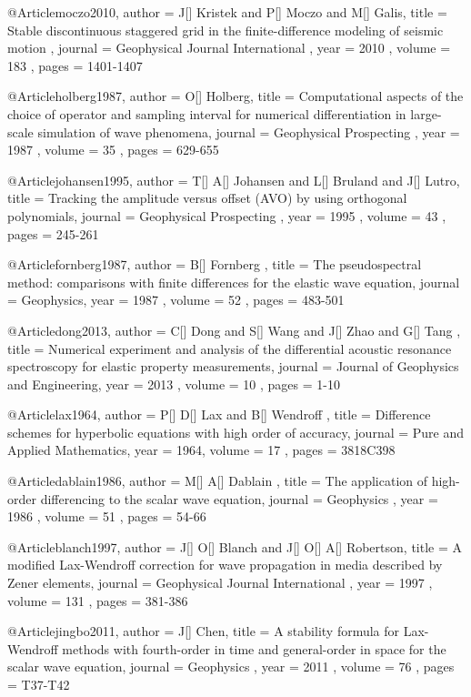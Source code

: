 {@Article{moczo2010,
 author =  {  J[] Kristek and P[] Moczo and M[] Galis},
 title =   {Stable discontinuous staggered grid in the finite-difference modeling of seismic motion },
 journal = { Geophysical Journal International },
 year =    { 2010 },
 volume =  { 183 },
 pages =   { 1401-1407 }
}

@Article{holberg1987,
 author =  { O[] Holberg},
 title =   {Computational aspects of the choice of operator and sampling interval for numerical differentiation in large-scale simulation of wave phenomena},
 journal = { Geophysical Prospecting },
 year =    { 1987 },
 volume =  { 35 },
 pages =   { 629-655 }
}

@Article{johansen1995,
 author =  { T[] A[] Johansen and L[] Bruland and J[] Lutro},
 title =   {Tracking the amplitude versus offset (AVO) by using orthogonal polynomials},
 journal = { Geophysical Prospecting },
 year =    { 1995 },
 volume =  { 43 },
 pages =   { 245-261 }
}

@Article{fornberg1987,
 author =  { B[] Fornberg },
 title =   {The pseudospectral method: comparisons with finite differences for the elastic
wave equation},
 journal = { Geophysics},
 year =    { 1987 },
 volume =  { 52 },
 pages =   { 483-501 }
}

@Article{dong2013,
 author =  { C[] Dong and S[] Wang and J[] Zhao and G[] Tang },
 title =   {Numerical experiment and analysis of the differential acoustic resonance spectroscopy for elastic property measurements},
 journal = { Journal of Geophysics and Engineering},
 year =    { 2013 },
 volume =  { 10 },
 pages =   { 1-10 }
}

@Article{lax1964,
 author =  { P[] D[] Lax and B[] Wendroff },
 title =   {Difference schemes for hyperbolic equations with high order of accuracy},
 journal = { Pure and Applied Mathematics},
 year =    { 1964},
 volume =  { 17 },
 pages =   { 381\A8C398 }
}

@Article{dablain1986,
 author =  { M[] A[] Dablain },
 title =   {The application of high-order differencing to the scalar wave equation},
 journal = { Geophysics },
 year =    { 1986 },
 volume =  { 51 },
 pages =   { 54-66 }
}


@Article{blanch1997,
 author =  { J[] O[] Blanch and J[] O[] A[] Robertson},
 title =   {A modified Lax-Wendroff correction for wave propagation in media described by Zener elements},
 journal = { Geophysical Journal International },
 year =    { 1997 },
 volume =  { 131 },
 pages =   { 381-386 }
}

@Article{jingbo2011,
 author =  { J[] Chen},
 title =   {A stability formula for Lax-Wendroff methods with fourth-order in time and general-order in space for the scalar wave equation},
 journal = { Geophysics },
 year =    { 2011 },
 volume =  { 76 },
 pages =   { T37-T42 }
}

}
